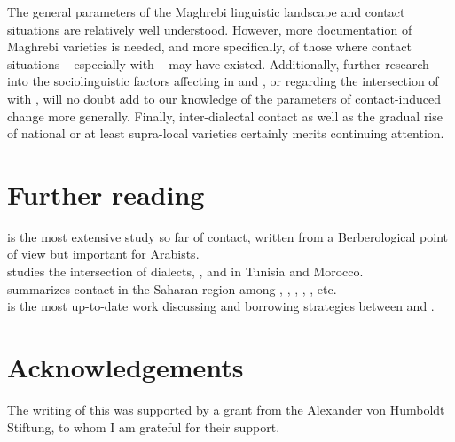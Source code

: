 \documentclass[output=paper]{langsci/langscibook}
\begin{document}
The general parameters of the Maghrebi linguistic landscape and contact situations are relatively well understood. However, more documentation of Maghrebi varieties is needed, and more specifically, of those where contact situations -- especially with  -- may have existed. Additionally, further research into the sociolinguistic factors affecting  in  and , or regarding the intersection of  with , will no doubt add to our knowledge of the parameters of contact-induced change more generally. Finally, inter-dialectal contact as well as the gradual rise of national or at least supra-local varieties certainly merits continuing attention.

\section*{Further reading}

\citet{Kossmann2013book} is the most extensive study so far of \textendash {} contact, written from a Berberological point of view but important for Arabists.\\
\citet{Sayahi2014} studies the intersection of dialects,  ,  and  in Tunisia and Morocco.\\
\citet{Souag2016sahara} summarizes contact in the Saharan region among , , , , , etc.\\
\citet{Ziamari2008} is the most up-to-date work discussing  and borrowing strategies between   and .

\section*{Acknowledgements}
The writing of this  was supported by a grant from the Alexander von Humboldt Stiftung, to whom I am grateful for their support.
\end{document}
